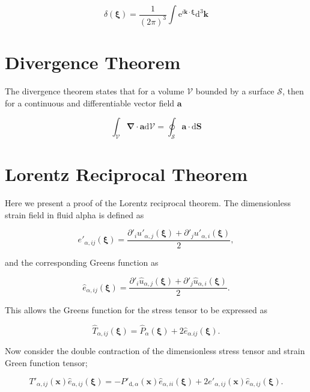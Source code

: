 \documentclass[12pt]{article}
\begin{document}
\begin{equation}
\label{equ:delta_int_def}
\delta (\boldsymbol{\xi}) = \frac{1}{(2 \pi)^{3}} \int \mathrm{e}^{i \boldsymbol{k} \cdot \boldsymbol{\xi}} \mathrm{d}^{3} \boldsymbol{k}
\end{equation}


\section{Divergence Theorem}
\label{app:div_theory}

The divergence theorem states that for a volume $\mathcal{V}$ bounded by a surface $\mathcal{S}$, then for a continuous and differentiable vector field $\boldsymbol{a}$ \cite{Riley06}

\begin{equation}
\label{equ:div_theory}
\int_{\mathcal{V}} \boldsymbol{\nabla} \cdot \boldsymbol{a} \mathrm{d} \mathcal{V} = \oint_{\mathcal{S}} \boldsymbol{a} \cdot \mathrm{d} \boldsymbol{S}
\end{equation}

\section{Lorentz Reciprocal Theorem}
\label{app:Lorentz}

Here we present a proof of the Lorentz reciprocal theorem. The dimensionless strain field in fluid alpha is defined as

\begin{equation}
\label{equ:dimles_strain}
e'_{\alpha,ij}(\boldsymbol{\xi}) = \frac{\partial'_{i} u'_{\alpha,j}(\boldsymbol{\xi}) + \partial'_{j} u'_{\alpha,i}(\boldsymbol{\xi})}{2} ,
\end{equation}


and the corresponding Greens function as

\begin{equation}
\label{equ:strain_green}
\hat{e}_{\alpha,ij}(\boldsymbol{\xi}) = \frac{\partial'_{i} \hat{u}_{\alpha,j}(\boldsymbol{\xi}) + \partial'_{j} \hat{u}_{\alpha,i}(\boldsymbol{\xi})}{2} .
\end{equation}

This allows the Greens function for the stress tensor to be expressed as

\begin{equation}
\label{equ:stress_with_strain}
\hat{T}_{\alpha,ij}(\boldsymbol{\xi}) = \hat{P}_{\alpha}(\boldsymbol{\xi}) + 2 \hat{e}_{\alpha.ij}(\boldsymbol{\xi}).
\end{equation}

Now consider the double contraction of the dimensionless stress tensor and strain Green function tensor;

\begin{equation}
\label{equ:stress_strain_contract}
T'_{\alpha,ij}(\boldsymbol{x}) \hat{e}_{\alpha,ij}(\boldsymbol{\xi}) = -P'_{\text{d},\alpha}(\boldsymbol{x}) \hat{e}_{\alpha,ii}(\boldsymbol{\xi}) + 2 e'_{\alpha,ij}(\boldsymbol{x}) \hat{e}_{\alpha,ij}(\boldsymbol{\xi}).
\end{equation}





\end{document}
